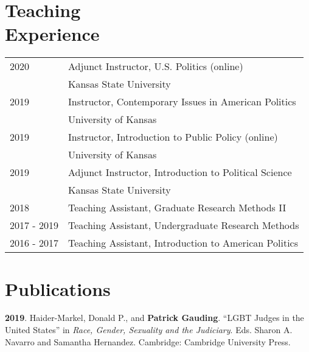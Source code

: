 \documentclass[margin,line,pifont,palatino,courier]{res}
\newenvironment{list1}{
  \begin{list}{\ding{113}}{%
      \setlength{\itemsep}{0in}
      \setlength{\parsep}{0in} \setlength{\parskip}{0in}
      \setlength{\topsep}{0in} \setlength{\partopsep}{0in}
      \setlength{\leftmargin}{0.17in}}}{\end{list}}
\newenvironment{list2}{
  \begin{list}{$\bullet$}{%
      \setlength{\itemsep}{0in}
      \setlength{\parsep}{0in} \setlength{\parskip}{0in}
      \setlength{\topsep}{0in} \setlength{\partopsep}{0in}
      \setlength{\leftmargin}{0.2in}}}{\end{list}}
\begin{document}
\begin{resume}
\begin{list1}

\end{list1}

\section{\sc Teaching\\ Experience}

\begin{tabular}{@{}p{0.8in}p{3.5in}}
  2020        & Adjunct Instructor, U.S. Politics (online)\\
              & Kansas State University\\
  2019        & Instructor, Contemporary Issues in American Politics\\
              & University of Kansas\\
  2019        & Instructor, Introduction to Public Policy (online) \\
              & University of Kansas \\
  2019        & Adjunct Instructor, Introduction to Political Science\\
              & Kansas State University\\
  2018        & Teaching Assistant, Graduate Research Methods II\\
  2017 - 2019 & Teaching Assistant, Undergraduate Research Methods\\
  2016 - 2017 & Teaching Assistant, Introduction to American Politics\\
\end{tabular}

\section{\sc Publications}

\textbf{2019}. Haider-Markel, Donald P., and \textbf{Patrick Gauding}. ``LGBT Judges
in the United States'' in \textit{Race, Gender, Sexuality and the
  Judiciary}. Eds. Sharon A. Navarro  and Samantha
Hernandez. Cambridge: Cambridge University Press.


\end{resume}
\end{document}
